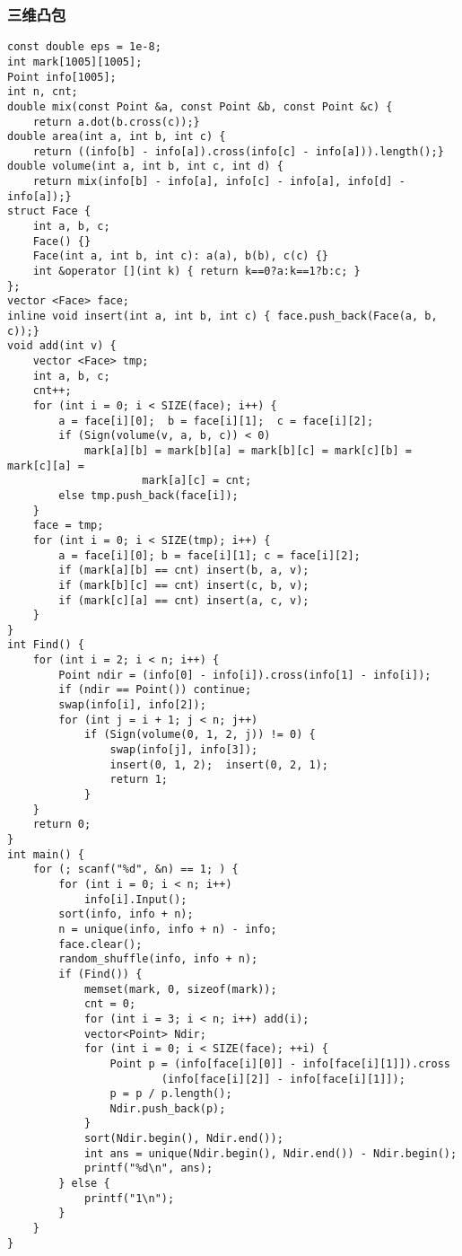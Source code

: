 \documentclass{article}
\begin{document}
\subsubsection{三维凸包}

\begin{lstlisting}
const double eps = 1e-8;
int mark[1005][1005];
Point info[1005];
int n, cnt;
double mix(const Point &a, const Point &b, const Point &c) {
    return a.dot(b.cross(c));}
double area(int a, int b, int c) {
    return ((info[b] - info[a]).cross(info[c] - info[a])).length();}
double volume(int a, int b, int c, int d) {
    return mix(info[b] - info[a], info[c] - info[a], info[d] - info[a]);}
struct Face {
    int a, b, c;
    Face() {}
    Face(int a, int b, int c): a(a), b(b), c(c) {}
    int &operator [](int k) { return k==0?a:k==1?b:c; }
};
vector <Face> face;
inline void insert(int a, int b, int c) { face.push_back(Face(a, b, c));}
void add(int v) {
    vector <Face> tmp;
    int a, b, c;
    cnt++;
    for (int i = 0; i < SIZE(face); i++) {
        a = face[i][0];  b = face[i][1];  c = face[i][2];
        if (Sign(volume(v, a, b, c)) < 0)
            mark[a][b] = mark[b][a] = mark[b][c] = mark[c][b] = mark[c][a] =
                     mark[a][c] = cnt;
        else tmp.push_back(face[i]);
    }
    face = tmp;
    for (int i = 0; i < SIZE(tmp); i++) {
        a = face[i][0]; b = face[i][1]; c = face[i][2];
        if (mark[a][b] == cnt) insert(b, a, v);
        if (mark[b][c] == cnt) insert(c, b, v);
        if (mark[c][a] == cnt) insert(a, c, v);
    }
}
int Find() {
    for (int i = 2; i < n; i++) {
        Point ndir = (info[0] - info[i]).cross(info[1] - info[i]);
        if (ndir == Point()) continue;
        swap(info[i], info[2]);
        for (int j = i + 1; j < n; j++)
            if (Sign(volume(0, 1, 2, j)) != 0) {
                swap(info[j], info[3]);
                insert(0, 1, 2);  insert(0, 2, 1);
                return 1;
            }
    }
    return 0;
}
int main() {
    for (; scanf("%d", &n) == 1; ) {
        for (int i = 0; i < n; i++)
            info[i].Input();
        sort(info, info + n);
        n = unique(info, info + n) - info;
        face.clear();
        random_shuffle(info, info + n);
        if (Find()) {
            memset(mark, 0, sizeof(mark));
            cnt = 0;
            for (int i = 3; i < n; i++) add(i);
            vector<Point> Ndir;
            for (int i = 0; i < SIZE(face); ++i) {
                Point p = (info[face[i][0]] - info[face[i][1]]).cross
                        (info[face[i][2]] - info[face[i][1]]);
                p = p / p.length();
                Ndir.push_back(p);
            }
            sort(Ndir.begin(), Ndir.end());
            int ans = unique(Ndir.begin(), Ndir.end()) - Ndir.begin();
            printf("%d\n", ans);
        } else {
            printf("1\n");
        }
    }
}
\end{lstlisting}
\end{document}
